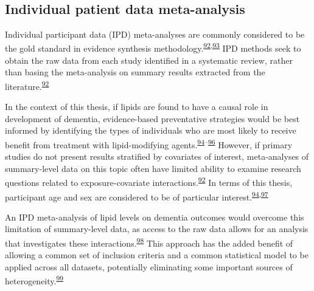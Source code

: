 \documentclass[a4paper, twoside]{templates/ociamthesis}
\begin{document}
~

\hypertarget{individual-patient-data-meta-analysis}{%
\subsection{Individual patient data meta-analysis}\label{individual-patient-data-meta-analysis}}

Individual participant data (IPD) meta-analyses are commonly considered to be the gold standard in evidence synthesis methodology.\textsuperscript{\protect\hyperlink{ref-riley2010}{92},\protect\hyperlink{ref-stewart1993}{93}} IPD methods seek to obtain the raw data from each study identified in a systematic review, rather than basing the meta-analysis on summary results extracted from the literature.\textsuperscript{\protect\hyperlink{ref-riley2010}{92}}

In the context of this thesis, if lipids are found to have a causal role in development of dementia, evidence-based preventative strategies would be best informed by identifying the types of individuals who are most likely to receive benefit from treatment with lipid-modifying agents.\textsuperscript{\protect\hyperlink{ref-arain2009}{94}--\protect\hyperlink{ref-mccartney2016}{96}} However, if primary studies do not present results stratified by covariates of interest, meta-analyses of summary-level data on this topic often have limited ability to examine research questions related to exposure-covariate interactions.\textsuperscript{\protect\hyperlink{ref-riley2010}{92}} In terms of this thesis, participant age and sex are considered to be of particular interest.\textsuperscript{\protect\hyperlink{ref-arain2009}{94},\protect\hyperlink{ref-letenneur1999}{97}}

An IPD meta-analysis of lipid levels on dementia outcomes would overcome this limitation of summary-level data, as access to the raw data allows for an analysis that investigates these interactions.\textsuperscript{\protect\hyperlink{ref-riley2020}{98}} This approach has the added benefit of allowing a common set of inclusion criteria and a common statistical model to be applied across all datasets, potentially eliminating some important sources of heterogeneity.\textsuperscript{\protect\hyperlink{ref-stewart2002}{99}}
\end{document}
